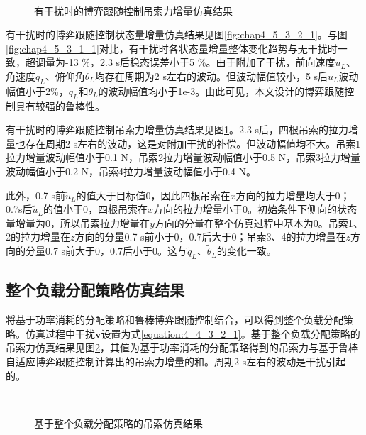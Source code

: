 \begin{figure}[!htb]
  \quad
  \\
  \quad
  \caption{有干扰时的博弈跟随控制吊索力增量仿真结果}
  \label{fig:chap4_5_3_2_2}
\end{figure}

有干扰时的博弈跟随控制状态量增量仿真结果见图\ref{fig:chap4_5_3_2_1}。与图\ref{fig:chap4_5_3_1_1}对比，有干扰时各状态量增量整体变化趋势与无干扰时一致，超调量为-13 \%，2.3 s后稳态误差小于5 \%。由于附加了干扰，前向速度$u_L$、角速度$q_L$、俯仰角$\theta_L$均存在周期为2 s左右的波动。但波动幅值较小，5 s后$u_L$波动幅值小于2\%，$q_L$和$\theta_L$的波动幅值均小于1e-3。由此可见，本文设计的博弈跟随控制具有较强的鲁棒性。

有干扰时的博弈跟随控制吊索力增量仿真结果见图\ref{fig:chap4_5_3_2_2}。2.3 s后，四根吊索的拉力增量也存在周期2 s左右的波动，这是对附加干扰的补偿。但波动幅值均不大。吊索1拉力增量波动幅值小于0.1 N，吊索2拉力增量波动幅值小于0.5 N，吊索3拉力增量波动幅值小于0.2 N，吊索4拉力增量波动幅值小于0.4 N。

此外，0.7 s前$\tilde{u}_L$的值大于目标值0，因此四根吊索在$x$方向的拉力增量均大于0；0.7s后$\tilde{u}_L$的值小于0，四根吊索在$x$方向的拉力增量小于0。初始条件下侧向的状态量增量为0，所以吊索拉力增量在$y$方向的分量在整个仿真过程中基本为0。吊索1、2的拉力增量在$z$方向的分量0.7 s前小于0，0.7后大于0；吊索3、4的拉力增量在$z$方向的分量0.7 s前大于0，0.7后小于0。这与$\tilde{q}_L$、$\tilde{\theta}_L$的变化一致。

\subsection{整个负载分配策略仿真结果}

将基于功率消耗的分配策略和鲁棒博弈跟随控制结合，可以得到整个负载分配策略。仿真过程中干扰$\mathbf{v}$设置为式\ref{equation:4_4_3_2_1}。基于整个负载分配策略的吊索力仿真结果见图\ref{fig:chap4_5_4_1}，其值为基于功率消耗的分配策略得到的吊索力与基于鲁棒自适应博弈跟随控制计算出的吊索力增量的和。周期2 s左右的波动是干扰引起的。

\begin{figure}[!htb]
  \quad
  \\
  \quad
  \caption{基于整个负载分配策略的吊索仿真结果}
  \label{fig:chap4_5_4_1}
\end{figure}

